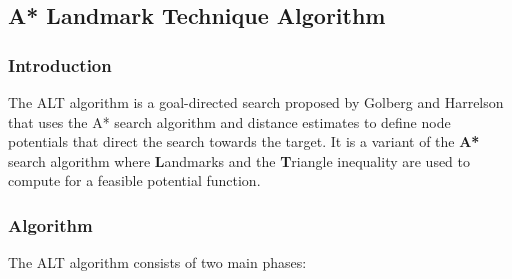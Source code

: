 	\subsection{A* Landmark Technique Algorithm}
		\subsubsection{Introduction}
			The ALT algorithm is a goal-directed search proposed by Golberg and Harrelson that uses the A* search algorithm and distance estimates to define node potentials that direct the search towards the target.
			It is a variant of the \textbf{A*} search algorithm where \textbf{L}andmarks and the \textbf{T}riangle inequality are used to compute for a feasible potential function. 
		\subsubsection{Algorithm}
			The ALT algorithm consists of two main phases:
